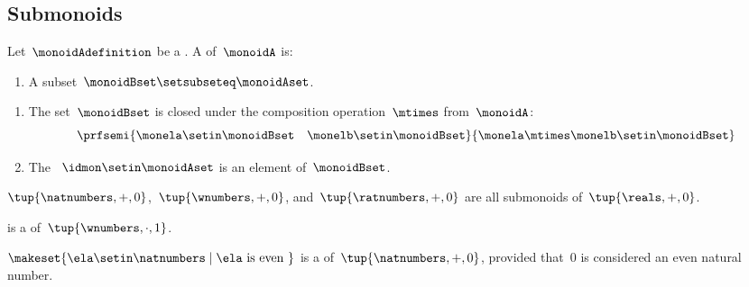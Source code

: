 \subsection{Submonoids}


\begin{definition}[Submonoids]\label{def:submonoids}
    Let~$\monoidAdefinition$ be a .
    A  of~$\monoidA$ is:

    \constit

    \begin{enumerate}
        \item A subset~$\monoidBset \setsubseteq \monoidAset$.
    \end{enumerate}

    \condit

    \begin{enumerate}
        \item The set~$\monoidBset$ is closed under the composition operation~$\mtimes$ from~$\monoidA$:
              \begin{equation}
                  \prfsemi{\monela \setin \monoidBset \quad \monelb \setin \monoidBset}{\monela \mtimes \monelb \setin \monoidBset}
              \end{equation}

        \item The ~$\idmon \setin \monoidAset$ is an element of~$\monoidBset$.
    \end{enumerate}
\end{definition}

\begin{example}
    $\tup{\natnumbers, +, 0}$,~$\tup{\wnumbers, +, 0}$, and~$\tup{\ratnumbers, +, 0}$ are all submonoids of~$\tup{\reals, +, 0}$.
\end{example}

\begin{example}
    \natnumbers  is a  of~$\tup{\wnumbers, \cdot, 1}$.
\end{example}

\begin{example}
    $\makeset{ \ela \setin \natnumbers \mid \ela \text{ is even } }$ is a  of~$\tup{\natnumbers, +, 0}$, provided that~$0$ is considered an even natural number.
\end{example}
